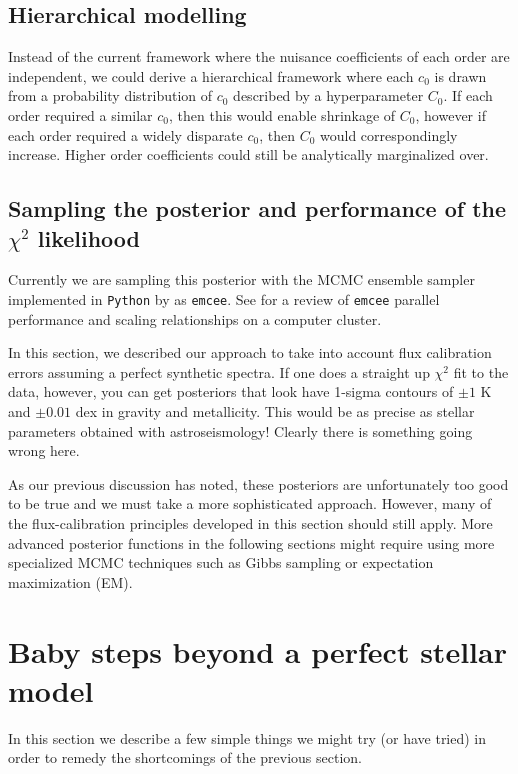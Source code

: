 \documentclass[preprint]{aastex} %
\begin{document}
\subsection{Hierarchical modelling}
Instead of the current framework where the nuisance coefficients of each order are independent, we could derive a hierarchical framework where each $c_0$ is drawn from a probability distribution of $c_0$ described by a hyperparameter $C_0$. If each order required a similar $c_0$, then this would enable shrinkage of $C_0$, however if each order required a widely disparate $c_0$, then $C_0$ would correspondingly increase. Higher order coefficients could still be analytically marginalized over. 

\subsection{Sampling the posterior and performance of the $\chi^2$ likelihood}
Currently we are sampling this posterior with the MCMC ensemble sampler \citep{gw10} implemented in \texttt{Python} by \citet{fhl+12} as \texttt{emcee}. See \citet[CosmoHAMMER]{asa+13} for a review of \texttt{emcee} parallel performance and scaling relationships on a computer cluster. 

In this section, we described our approach to take into account flux calibration errors assuming a perfect synthetic spectra. If one does a straight up $\chi^2$ fit to the data, however, you can get posteriors that look have 1-sigma contours of $\pm 1$ K and $\pm 0.01$ dex in gravity and metallicity. This would be as precise as stellar parameters obtained with astroseismology! Clearly there is something going wrong here.

As our previous discussion has noted, these posteriors are unfortunately too good to be true and we must take a more sophisticated approach. However, many of the flux-calibration principles developed in this section should still apply. More advanced posterior functions in the following sections might require using more specialized MCMC techniques such as Gibbs sampling or expectation maximization (EM). 

\section{Baby steps beyond a perfect stellar model}
\label{sec:residuals}
In this section we describe a few simple things we might try (or have tried) in order to remedy the shortcomings of the previous section.
\end{document}
